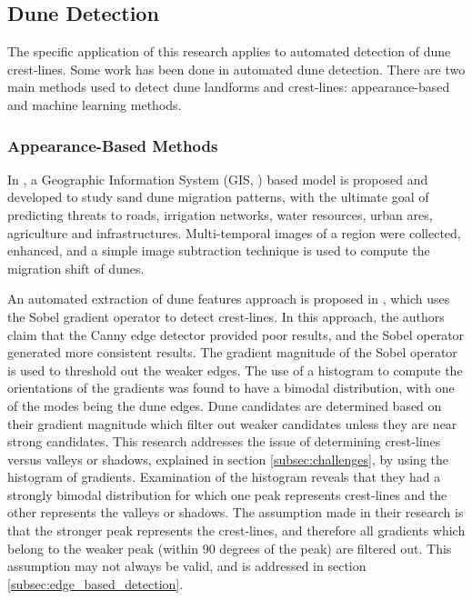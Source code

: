 \subsection{Dune Detection} \label{subsec:dune_detection}
The specific application of this research applies to automated detection of dune crest-lines. Some work has been done in automated dune detection. There are two main methods used to detect dune landforms and crest-lines: appearance-based and machine learning methods.

\subsubsection{Appearance-Based Methods}
In \cite{2012_automated_extraction_sand_dunes_egypt}, a Geographic Information System (GIS, \cite{gis_article}) based model is proposed and developed to study sand dune migration patterns, with the ultimate goal of predicting threats to roads, irrigation networks, water resources, urban ares, agriculture and infrastructures. Multi-temporal images of a region were collected, enhanced, and a simple image subtraction technique is used to compute the migration shift of dunes.

An automated extraction of dune features approach is proposed in \cite{2015_automated_mapping_of_linear_dunefield}, which uses the Sobel gradient operator to detect crest-lines. In this approach, the authors claim that the Canny edge detector provided poor results, and the Sobel operator generated more consistent results. The gradient magnitude of the Sobel operator is used to threshold out the weaker edges. The use of a histogram to compute the orientations of the gradients was found to have a bimodal distribution, with one of the modes being the dune edges. Dune candidates are determined based on their gradient magnitude which filter out weaker candidates unless they are near strong candidates. This research addresses the issue of determining crest-lines versus valleys or shadows, explained in section \ref{subsec:challenges}, by using the histogram of gradients. Examination of the histogram reveals that they had a strongly bimodal distribution for which one peak represents crest-lines and the other represents the valleys or shadows. The assumption made in their research is that the stronger peak represents the crest-lines, and therefore all gradients which belong to the weaker peak (within 90 degrees of the peak) are filtered out. This assumption may not always be valid, and is addressed in section \ref{subsec:edge_based_detection}.

